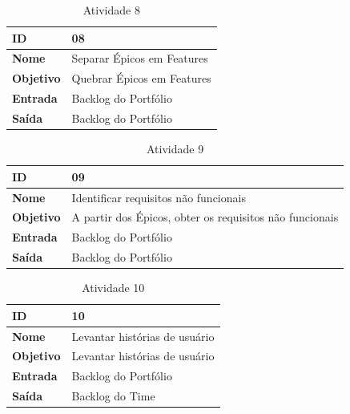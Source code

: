 \begin{table}[h]
	\centering
	\caption{Atividade 8}
	\label{my-label}
	\begin{tabular}{|l|l|}
	\hline
	\textbf{ID}       & 08                         \\ \hline
	\textbf{Nome}     & Separar Épicos em Features \\ \hline
	\textbf{Objetivo} & Quebrar Épicos em Features \\ \hline
	\textbf{Entrada}  & Backlog do Portfólio       \\ \hline
	\textbf{Saída}    & Backlog do Portfólio       \\ \hline
	\end{tabular}
\end{table}

\begin{table}[h]
	\centering
	\caption{Atividade 9}
	\label{my-label}
	\begin{tabular}{|l|l|}
	\hline
	\textbf{ID}       & 09                                                       \\ \hline
	\textbf{Nome}     & Identificar requisitos não funcionais                    \\ \hline
	\textbf{Objetivo} & A partir dos Épicos, obter os requisitos não funcionais  \\ \hline
	\textbf{Entrada}  & Backlog do Portfólio                                     \\ \hline
	\textbf{Saída}    & Backlog do Portfólio                                     \\ \hline
	\end{tabular}
\end{table}

\begin{table}[h]
	\centering
	\caption{Atividade 10}
	\label{my-label}
	\begin{tabular}{|l|l|}
	\hline
	\textbf{ID}       & 10                            \\ \hline
	\textbf{Nome}     & Levantar histórias de usuário \\ \hline
	\textbf{Objetivo} & Levantar histórias de usuário \\ \hline
	\textbf{Entrada}  & Backlog do Portfólio          \\ \hline
	\textbf{Saída}    & Backlog do Time               \\ \hline
\end{tabular}
\end{table}

